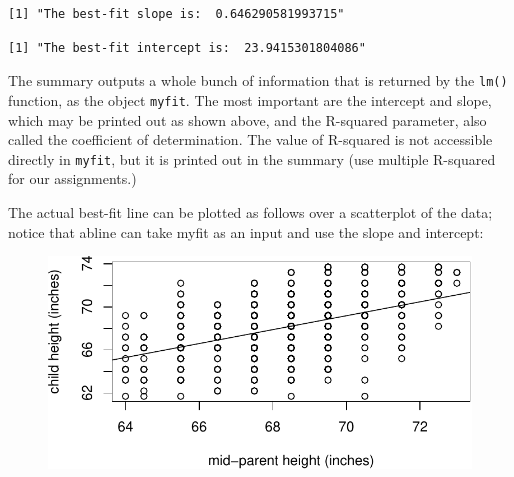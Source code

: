 \documentclass[
  letterpaper,
  DIV=11,
  numbers=noendperiod]{scrreprt}
\newenvironment{Shaded}{\begin{snugshade}}{\end{snugshade}}
\newcommand{\AttributeTok}[1]{\textcolor[rgb]{0.40,0.45,0.13}{#1}}
\newcommand{\CommentTok}[1]{\textcolor[rgb]{0.37,0.37,0.37}{#1}}
\newcommand{\DecValTok}[1]{\textcolor[rgb]{0.68,0.00,0.00}{#1}}
\newcommand{\FunctionTok}[1]{\textcolor[rgb]{0.28,0.35,0.67}{#1}}
\newcommand{\NormalTok}[1]{\textcolor[rgb]{0.00,0.23,0.31}{#1}}
\newcommand{\SpecialCharTok}[1]{\textcolor[rgb]{0.37,0.37,0.37}{#1}}
\newcommand{\StringTok}[1]{\textcolor[rgb]{0.13,0.47,0.30}{#1}}
\begin{document}
\begin{verbatim}
[1] "The best-fit slope is:  0.646290581993715"
\end{verbatim}

\begin{Shaded}
\end{Shaded}

\begin{verbatim}
[1] "The best-fit intercept is:  23.9415301804086"
\end{verbatim}

The summary outputs a whole bunch of information that is returned by the
\texttt{lm()} function, as the object \texttt{myfit}. The most important
are the intercept and slope, which may be printed out as shown above,
and the R-squared parameter, also called the coefficient of
determination. The value of R-squared is not accessible directly in
\texttt{myfit}, but it is printed out in the summary (use multiple
R-squared for our assignments.)

The actual best-fit line can be plotted as follows over a scatterplot of
the data; notice that abline can take myfit as an input and use the
slope and intercept:

\begin{Shaded}
\end{Shaded}

\begin{figure}[H]

{\centering \includegraphics{./linreg_files/figure-pdf/unnamed-chunk-3-1.pdf}

}

\end{figure}
\end{document}
